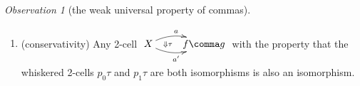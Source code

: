 \documentclass[12pt,reqno]{amsart}
\theoremstyle{plain}
\theoremstyle{definition}
\theoremstyle{remark}
\newtheorem{obs}[thm]{Observation}
\numberwithin{equation}{subsection}
\begin{document}
\begin{obs}[the weak universal property of commas]
\begin{enumerate}[label=(\roman*)]
\[\]
  then there exists a 2-cell $\tau \colon a \Rightarrow a'$, defined by \emph{2-cell induction}, satisfying the equalities 
  \[     \vcenter{\xymatrix@=10pt{
      & {X}\ar[dl]_{a'}\ar[dr]^{a}
      \ar@{}[dd]|(.4){\tau_1}|{\Leftarrow} & \\
      {f\comma g}\ar[dr]_{p_1} & & 
      {f\comma g}\ar[dl]^{p_1} \\
      & C &
    }}     \mkern10mu = \mkern10mu
        \vcenter{\xymatrix@=30pt{ X \ar@/^3ex/[d]^a \ar@/_3ex/[d]_{a'} \ar@{}[d]|(.4){\tau}|{\Leftarrow}  \\ f \downarrow g \ar[d]^{p_1} \\ C}}
      \mkern20mu\text{and}\mkern20mu
  \vcenter{\xymatrix@=10pt{
      & {X}\ar[dl]_{a'}\ar[dr]^{a}
      \ar@{}[dd]|(.4){\tau_0}|{\Leftarrow} & \\
      {f\comma g}\ar[dr]_{p_0} & & 
      {f\comma g}\ar[dl]^{p_0} \\
      & B &
    }}    \mkern10mu = \mkern10mu
    \vcenter{\xymatrix@=30pt{ X \ar@/^3ex/[d]^a \ar@/_3ex/[d]_{a'} \ar@{}[d]|(.4){\tau}|{\Leftarrow}  \\ f \downarrow g \ar[d]^{p_0} \\ B}}  
  \]

    \item (conservativity) Any 2-cell $\xymatrix{ X \ar@/^2ex/[r]^{a} \ar@/_2ex/[r]_{a'} \ar@{}[r]|-{\Downarrow\tau} & { f \comma g}}$  with the property that the whiskered 2-cells $p_0\tau$ and $p_1\tau$ are both isomorphisms is also an isomorphism.
  \end{enumerate}
\end{obs}
\end{document}
